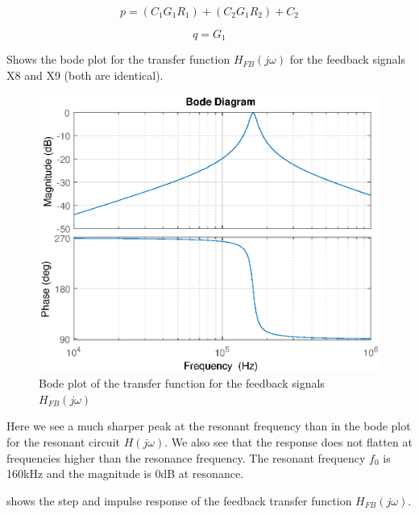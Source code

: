 \begin{equation} \label{eq:fb_p}
    p = (C_1 G_1 R_1) + (C_2 G_1 R_2) + C_2
\end{equation}

\begin{equation} \label{eq:fb_q}
    q = G_1
\end{equation}

 Shows the bode plot for the transfer function $H_{FB}(j\omega)$ for the feedback signals X8 and X9 (both are identical).

\begin{figure}[H]
    \centering
    \includegraphics[width=\textwidth]{img/FeedBackBode.eps}
    \caption{Bode plot of the transfer function for the feedback signals $H_{FB}(j\omega)$}
    \label{fig:fb_bode}
\end{figure}

Here we see a much sharper peak at the resonant frequency than in the bode plot for the resonant circuit $H(j\omega)$. We also see that the response does not flatten at frequencies higher than the resonance frequency. The resonant frequency $f_0$ is 160kHz and the magnitude is 0dB at resonance.


 shows the step and impulse response of the feedback transfer function $H_{FB}(j\omega)$.

